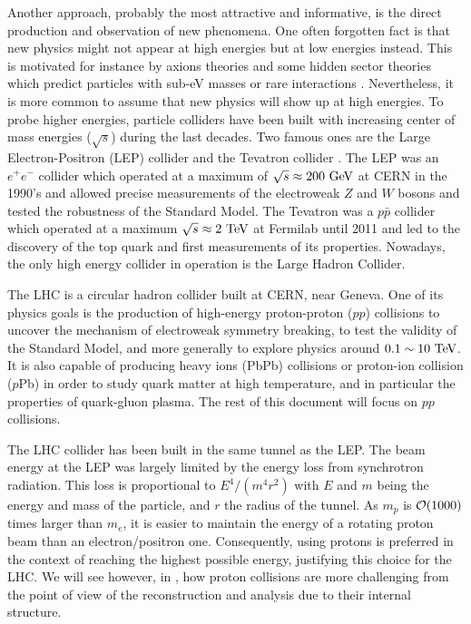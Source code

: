     Another approach, probably the most attractive and informative, is the
    direct production and observation of new phenomena. One often forgotten fact
    is that new physics might not appear at high energies but at low energies
    instead. This is motivated for instance by axions theories and some hidden
    sector theories which predict particles with sub-eV masses or rare
    interactions \cite{PolarizedHelium, CavityForHiddenPhotons}. Nevertheless,
    it is more common to assume that new physics will show up at high energies.
    To probe higher energies, particle colliders have been built with increasing
    center of mass energies ($\sqrt{s}$) during the last decades.  Two famous
    ones are the Large Electron-Positron (LEP) collider \cite{LEP} and the
    Tevatron collider \cite{Tevatron}. The LEP was an $e^+e^-$ collider which
    operated at a maximum of $\sqrt{s} \approx 200~\text{GeV}$ at CERN in the 1990's
    and allowed precise measurements of the electroweak $Z$ and $W$ bosons and
    tested the robustness of the Standard Model. The Tevatron was a $p\bar{p}$
    collider which operated at a maximum $\sqrt{s} \approx 2~\text{TeV}$ at Fermilab
    until 2011 and led to the discovery of the top quark and first measurements
    of its properties.  Nowadays, the only high energy collider in operation is
    the Large Hadron Collider.

    The LHC \cite{LHC} is a circular hadron collider built at CERN, near Geneva.
    One of its physics goals is the production of high-energy proton-proton
    ($pp$) collisions to uncover the mechanism of electroweak symmetry breaking,
    to test the validity of the Standard Model, and more generally to explore
    physics around $0.1 \sim 10~\text{TeV}$.  It is also capable of producing heavy
    ions (PbPb) collisions or proton-ion collision ($p$Pb) in order to study
    quark matter at high temperature, and in particular the properties of
    quark-gluon plasma. The rest of this document will focus on $pp$ collisions.

    The LHC collider has been built in the same tunnel as the LEP. The beam
    energy at the LEP was largely limited by the energy loss from synchrotron
    radiation. This loss is proportional to $E^4 / (m^{4} r^{2})$ with $E$ and
    $m$ being the energy and mass of the particle, and $r$ the radius of the
    tunnel. As $m_p$ is $\mathcal{O}(1000)$ times larger than $m_e$, it is easier
    to maintain the energy of a rotating proton beam than an electron/positron
    one.  Consequently, using protons is preferred in the context of reaching
    the highest possible energy, justifying this choice for the LHC. We will see
    however, in , how proton
    collisions are more challenging from the point of view of the reconstruction
    and analysis due to their internal structure.


